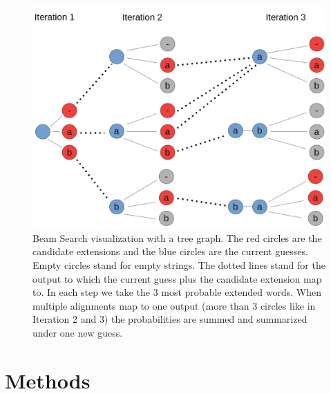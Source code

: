 \documentclass{article}
\begin{document}
\begin{figure}[H]
\begin{center}
\includegraphics[scale=0.2]{rsz_beam}
\end{center}
\caption{Beam Search visualization with a tree graph. The red circles are the candidate extensions and the blue circles are the current guesses. Empty circles stand for empty strings. The dotted lines stand for the output to which the current guess plus the candidate extension map to. In each step we take the 3 most probable extended words. When multiple alignments map to one output (more than 3 circles like in Iteration 2 and 3) the probabilities are summed and summarized under one new guess. }
\end{figure}  

\newpage
\section{Methods}
\end{document}
